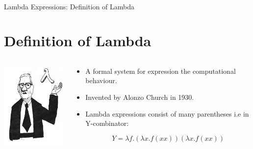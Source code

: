 \documentclass{beamer}
\begin{document}
	\begin{frame}{Lambda Expressions: Definition of Lambda}
		\section{Definition of Lambda}
		\begin{columns}
    			\begin{column}{0.3\textwidth}
					\centering
					\includegraphics[width=4cm]{church}	
    			\end{column}
    			\begin{column}{0.7\textwidth}
					
					\begin{itemize}
						\item A formal system for expression the computational behaviour.
						\item Invented by Alonzo Church in 1930.	
						\item Lambda expressions consist of many parentheses i.e in Y-combinator:					
					
						\[ Y = \lambda f. (\lambda x. f (x x))(\lambda x. f (x x)) \]
					\end{itemize}
    			\end{column}
		\end{columns}
	\end{frame}	
\end{document}
